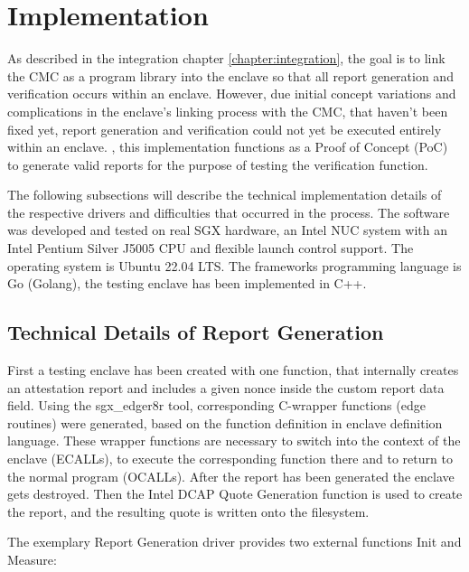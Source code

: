 
\chapter{Implementation}\label{chapter:implementation}

As described in the integration chapter \ref{chapter:integration}, the goal is to link the CMC as a program library into the enclave so that all report generation and verification occurs within an enclave.
However, due initial concept variations and complications in the enclave’s linking process with the CMC, that haven’t been fixed yet, report generation and verification could not yet be executed entirely within an enclave. 
, this implementation functions as a Proof of Concept (PoC) to generate valid reports for the purpose of testing the verification function.

The following subsections will describe the technical implementation details of the respective drivers and difficulties that occurred in the process. 
The software was developed and tested on real SGX hardware, an Intel NUC system with an Intel Pentium Silver J5005 CPU and flexible launch control support. The operating system is Ubuntu 22.04 LTS. The frameworks programming language is Go (Golang), the testing enclave has been implemented in C++.  

\section{Technical Details of Report Generation}
First a testing enclave has been created with one function, that internally creates an attestation report and includes a given nonce inside the custom report data field. 
Using the sgx\_edger8r tool, corresponding C-wrapper functions (edge routines) were generated, based on the function definition in enclave definition language. These wrapper functions are necessary to switch into the context of the enclave (ECALLs), to execute the corresponding function there and to return to the normal program (OCALLs). \cite{sgx_whitepaper}
After the report has been generated the enclave gets destroyed. Then the Intel DCAP Quote Generation function is used to create the report, and the resulting quote is written onto the filesystem. 

The exemplary Report Generation driver provides two external functions Init and Measure:

